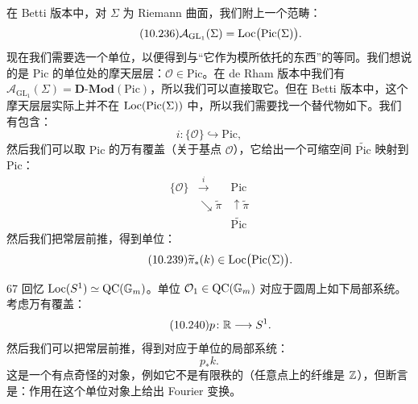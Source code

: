 在 Betti 版本中，对 $\Sigma$ 为 Riemann 曲面，我们附上一个范畴：
\begin{equation}\tag{10.236}
\mathcal{A}_{\mathrm{GL}_1}(\Sigma)=\mathrm{Loc}\big(\mathrm{Pic}(\Sigma)\big).
\end{equation}
现在我们需要选一个单位，以便得到与“它作为模所依托的东西”的等同。我们想说的是 $\mathrm{Pic}$ 的单位处的摩天层层：$\mathcal{O}\in\mathrm{Pic}$。在 de Rham 版本中我们有 $\mathcal{A}_{\mathrm{GL}_1}(\Sigma)=\mathbf{D}\text{-}\mathbf{Mod}(\mathrm{Pic})$，所以我们可以直接取它。但在 Betti 版本中，这个摩天层层实际上并不在 $\mathrm{Loc}(\mathrm{Pic}(\Sigma))$ 中，所以我们需要找一个替代物如下。我们有包含：
\begin{equation}\tag{10.237}
i\colon\{\mathcal{O}\}\hookrightarrow\mathrm{Pic},
\end{equation}
然后我们可以取 $\mathrm{Pic}$ 的万有覆盖（关于基点 $\mathcal{O}$），它给出一个可缩空间 $\widetilde{\mathrm{Pic}}$ 映射到 $\mathrm{Pic}$：
\begin{equation}\tag{10.238}
\begin{array}{ccc}
\{\mathcal{O}\} & \xrightarrow{\ i\ } & \mathrm{Pic}\\[4pt]
& \searrow{\scriptstyle \widetilde{\pi}} & \uparrow{\scriptstyle \widetilde{\pi}}\\[4pt]
& & \widetilde{\mathrm{Pic}}
\end{array}
\end{equation}
然后我们把常层前推，得到单位：
\begin{equation}\tag{10.239}
\widetilde{\pi}_*(k)\in\mathrm{Loc}\big(\mathrm{Pic}(\Sigma)\big).
\end{equation}

\begin{srcex}{67}
回忆 $\mathrm{Loc}(S^1)\simeq\mathrm{QC}(\mathbb{G}_m)$。单位 $\mathcal{O}_1\in\mathrm{QC}(\mathbb{G}_m)$ 对应于圆周上如下局部系统。考虑万有覆盖：
\begin{equation}\tag{10.240}
p\colon\mathbb{R}\longrightarrow S^1.
\end{equation}
然后我们可以把常层前推，得到对应于单位的局部系统：
\begin{equation}\tag{10.241}
p_*k.
\end{equation}
这是一个有点奇怪的对象，例如它不是有限秩的（任意点上的纤维是 $\mathbb{Z}$），但断言是：作用在这个单位对象上给出 Fourier 变换。
\end{srcex}

